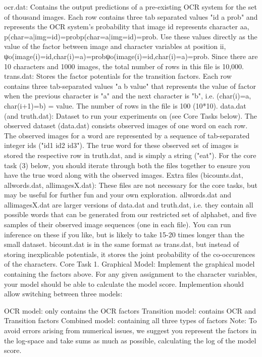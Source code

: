 ocr.dat: Contains the output predictions of a pre-existing OCR system for the set of thousand images. Each row contains three tab separated values "id a prob" and represents the OCR system's probability that image id represents character aa, p(char=a|img=id)=probp(char=a|img=id)=prob. Use these values directly as the value of the factor between image and character variables at position ii, ψo(image(i)=id,char(i)=a)=probψo(image(i)=id,char(i)=a)=prob. Since there are 10 characters and 1000 images, the total number of rows in this file is 10,000.
trans.dat: Stores the factor potentials for the transition factors. Each row contains three tab-separated values "a b value" that represents the value of factor when the previous character is "a" and the next character is "b", i.e. (char(i)=a, char(i+1)=b) = value. The number of rows in the file is 100 (10*10). data.dat (and truth.dat): Dataset to run your experiments on (see Core Tasks below). The observed dataset (data.dat) consists observed images of one word on each row. The observed images for a word are represented by a sequence of tab-separated integer ids ("id1 id2 id3"). The true word for these observed set of images is stored the respective row in truth.dat, and is simply a string ("eat"). For the core task (3) below, you should iterate through both the files together to ensure you have the true word along with the observed images.
Extra files (bicounts.dat, allwords.dat, allimagesX.dat): These files are not necessary for the core tasks, but may be useful for further fun and your own exploration. allwords.dat and allimagesX.dat are larger versions of data.dat and truth.dat, i.e. they contain all possible words that can be generated from our restricted set of alphabet, and five samples of their observed image sequences (one in each file). You can run inference on these if you like, but is likely to take 15-20 times longer than the small dataset. bicount.dat is in the same format as trans.dat, but instead of storing inexplicable potentials, it stores the joint probability of the co-occurences of the characters.
Core Task
1. Graphical Model: Implement the graphical model containing the factors above. For any given assignment to the character variables, your model should be able to calculate the model score. Implemention should allow switching between three models:

OCR model: only contains the OCR factors
Transition model: contains OCR and Transition factors
Combined model: containing all three types of factors
Note: To avoid errors arising from numerical issues, we suggest you represent the factors in the log-space and take sums as much as possible, calculating the log of the model score.


